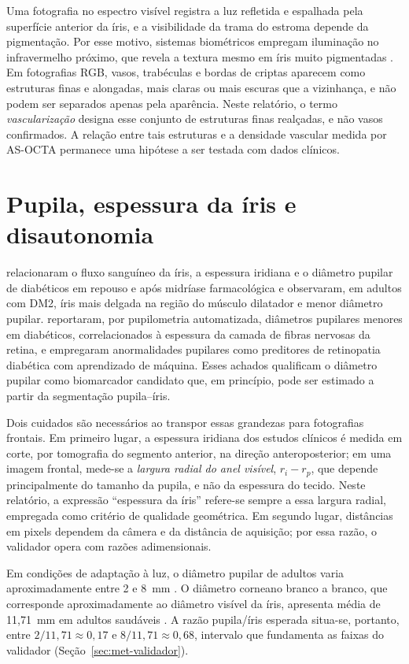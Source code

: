 \documentclass[12pt, oneside, a4paper, chapter=TITLE, section=TITLE,
               english, brazil]{abntex2}
\newcommand{\secao}[1]{\section[\texorpdfstring{\protect\MakeTextUppercase{#1}}{#1}]{#1}}
\begin{document}
Uma fotografia no espectro visível registra a luz refletida e espalhada pela
superfície anterior da íris, e a visibilidade da trama do estroma depende da
pigmentação. Por esse motivo, sistemas biométricos empregam iluminação no
infravermelho próximo, que revela a textura mesmo em íris muito pigmentadas
\citep*{Daugman2004}. Em fotografias RGB, vasos, trabéculas e bordas de
criptas aparecem como estruturas finas e alongadas, mais claras ou mais
escuras que a vizinhança, e não podem ser separados apenas pela aparência.
Neste relatório, o termo \emph{vascularização} designa esse conjunto de
estruturas finas realçadas, e não vasos confirmados. A relação entre tais
estruturas e a densidade vascular medida por AS-OCTA permanece uma hipótese a
ser testada com dados clínicos.

\secao{Pupila, espessura da íris e disautonomia}

\citet{Cui2024} relacionaram o fluxo sanguíneo da íris, a espessura iridiana e
o diâmetro pupilar de diabéticos em repouso e após midríase farmacológica e
observaram, em adultos com DM2, íris mais delgada na região do músculo
dilatador e menor diâmetro pupilar. \citet{Thakar2025} reportaram, por
pupilometria automatizada, diâmetros pupilares menores em diabéticos,
correlacionados à espessura da camada de fibras nervosas da retina, e
\citet{Surya2026} empregaram anormalidades pupilares como preditores de
retinopatia diabética com aprendizado de máquina. Esses achados qualificam o
diâmetro pupilar como biomarcador candidato que, em princípio, pode ser
estimado a partir da segmentação pupila--íris.

Dois cuidados são necessários ao transpor essas grandezas para fotografias
frontais. Em primeiro lugar, a espessura iridiana dos estudos clínicos é
medida em corte, por tomografia do segmento anterior, na direção
anteroposterior; em uma imagem frontal, mede-se a \emph{largura radial do anel
visível}, $r_i - r_p$, que depende principalmente do tamanho da pupila, e não
da espessura do tecido. Neste relatório, a expressão ``espessura da íris''
refere-se sempre a essa largura radial, empregada como critério de qualidade
geométrica. Em segundo lugar, distâncias em pixels dependem da câmera e da
distância de aquisição; por essa razão, o validador opera com razões
adimensionais.

Em condições de adaptação à luz, o diâmetro pupilar de adultos varia
aproximadamente entre 2 e 8~mm \citep*{WatsonYellott2012}. O diâmetro corneano
branco a branco, que corresponde aproximadamente ao diâmetro visível da íris,
apresenta média de 11,71~mm em adultos saudáveis \citep*{Rufer2005}. A razão
pupila/íris esperada situa-se, portanto, entre $2/11{,}71 \approx 0{,}17$ e
$8/11{,}71 \approx 0{,}68$, intervalo que fundamenta as faixas do validador
(Seção~\ref{sec:met-validador}).
\end{document}
